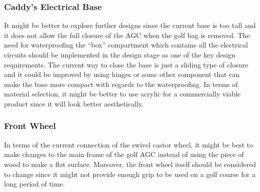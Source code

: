 \documentclass[11pt,landscape]{article}
\begin{document}
\begin{multicols}{2}
\subsubsection{Caddy's Electrical Base}
It might be better to explore further designs since the current base is too
tall and it does not allow the full closure of the AGC when the golf bag
is removed. The need for waterproofing the “box” compartment which contains
all the electrical circuits should be implemented in the design stage as one
of the key design requirements. The current way to close the base is just a
sliding type of closure and it could be improved by using hinges or some
other component that can make the base more compact with regards to the
waterproofing. In terms of material selection, it might be better to use
acrylic for a commercially viable product since it will look better
aesthetically. 

\subsubsection{Front Wheel}
In terms of the current connection of the swivel castor wheel, it might be
best to make changes to the main frame of the golf AGC instead of using
the piece of wood to make a flat surface. Moreover, the front wheel itself
should be considered to change since it might not provide enough grip to be
used on a golf course for a long period of time.
    
\end{multicols}
\end{document}
